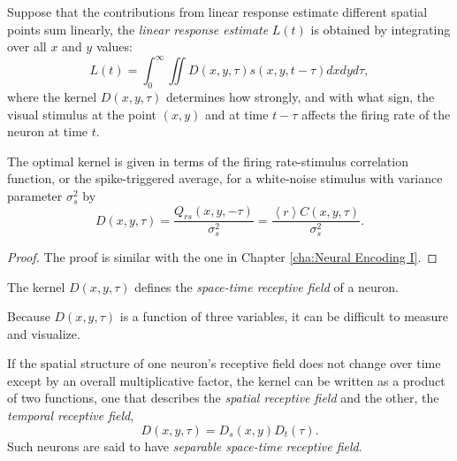 \begin{defn}
  \label{def:linearResponseEstimate}
  Suppose that the contributions from linear response estimate different spatial points sum linearly, the \emph{linear response estimate} $L(t)$ is obtained by integrating over all $x$ and $y$ values:
  \begin{equation}
    \label{equ:2.24}
    L(t) = \int_0^{\infty}\iint D(x,y,\tau)s(x,y,t-\tau)dxdyd\tau,
  \end{equation}
  where the kernel $D(x,y,\tau)$ determines how strongly, and with what sign, the visual stimulus at the point $(x,y)$ and at time $t-\tau$ affects the firing rate of the neuron at time $t$.
\end{defn}

\begin{prop}
  The optimal kernel is given in terms of the firing rate-stimulus correlation function, or the spike-triggered average, for a white-noise stimulus with variance parameter $\sigma_s^2$ by
  \begin{equation}
    \label{equ:2.25}
    D(x,y,\tau) = \frac{Q_{rs}(x,y,-\tau)}{\sigma_s^2} = \frac{\left<r\right>C(x,y,\tau)}{\sigma_s^2}.
  \end{equation}
\end{prop}
\begin{proof}
  The proof is similar with the one in Chapter \ref{cha:Neural Encoding I}.
\end{proof}

\begin{defn}
  \label{def:space-timeReceptiveField}
  The kernel $D(x,y,\tau)$ defines the \emph{space-time receptive field} of a neuron.
\end{defn}

\begin{rem}
  Because $D(x,y,\tau)$ is a function of three variables, it can be difficult to measure and visualize.
\end{rem}

\begin{defn}
  \label{def:separableReceptiveField}
  If the spatial structure of one neuron's receptive field does not change over time except by an overall multiplicative factor, the kernel can be written as a product of two functions, one that describes the \emph{spatial receptive field} and the other, the \emph{temporal receptive field},
  \begin{equation}
    \label{equ:2.26}
    D(x,y,\tau) = D_s(x,y)D_t(\tau).
  \end{equation}
  Such neurons are said to have \emph{separable space-time receptive field}.
\end{defn}

